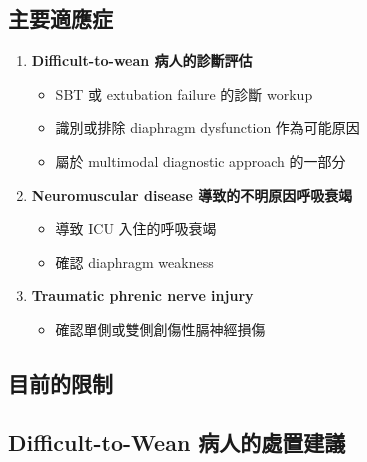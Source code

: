 \documentclass[12pt,a4paper]{article}
\begin{document}
\subsection{主要適應症}

\begin{enumerate}
    \item \textbf{Difficult-to-wean 病人的診斷評估}
    \begin{itemize}
        \item SBT 或 extubation failure 的診斷 workup
        \item 識別或排除 diaphragm dysfunction 作為可能原因
        \item 屬於 multimodal diagnostic approach 的一部分
    \end{itemize}

    \item \textbf{Neuromuscular disease 導致的不明原因呼吸衰竭}
    \begin{itemize}
        \item 導致 ICU 入住的呼吸衰竭
        \item 確認 diaphragm weakness
    \end{itemize}

    \item \textbf{Traumatic phrenic nerve injury}
    \begin{itemize}
        \item 確認單側或雙側創傷性膈神經損傷
    \end{itemize}
\end{enumerate}

\subsection{目前的限制}


\subsection{Difficult-to-Wean 病人的處置建議}
\end{document}
